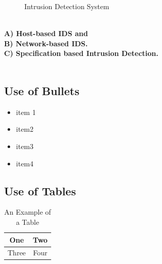 \begin{figure}[h]
\centering
{}
\caption{Intrusion Detection System}
\label{Intrusion Detection System}
\end{figure}
\\
\textbf{A) Host-based IDS and\\
B) Network-based IDS.\\
C) Specification based Intrusion Detection.}\\
\\
\subsection{Use of Bullets}
\begin{itemize}
\item item 1\\
\item item2\\ 
\item item3\\
\item item4\\
\end{itemize}

\subsection{Use of Tables}
\begin{table}[h]
\begin{center}
\begin{tabular}{|c||c|}
\hline
One & Two\\
\hline
Three & Four\\
\hline
\end{tabular}
\caption{An Example of a Table}
\label{table_example}
\end{center}
\end{table}